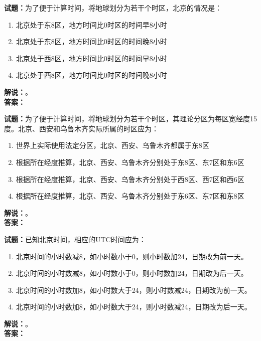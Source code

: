 \documentclass{ctexbook}
\begin{document}
\noindent\textbf{试题：}为了便于计算时间，将地球划分为若干个时区，北京的情况是：
\begin{enumerate}[leftmargin=3em]
\item 北京处于东8区，地方时间比0时区的时间早8小时
\item 北京处于东8区，地方时间比0时区的时间晚8小时
\item 北京处于西8区，地方时间比0时区的时间早8小时
\item 北京处于西8区，地方时间比0时区的时间晚8小时
\end{enumerate}
\noindent\textbf{解说：}\textbf{}。\\\noindent\textbf{答案：}

\bigskip




\noindent\textbf{试题：}为了便于计算时间，将地球划分为若干个时区，其理论分区为每区宽经度15度。北京、西安和乌鲁木齐实际所属的时区应为：
\begin{enumerate}[leftmargin=3em]
\item 世界上实际使用法定分区，北京、西安、乌鲁木齐都属于东8区
\item 根据所在经度推算，北京、西安、乌鲁木齐分别处于东8区、东7区和东6区
\item 根据所在经度推算，北京、西安、乌鲁木齐分别处于西8区、西7区和西6区
\item 根据所在经度推算，北京、西安、乌鲁木齐分别处于东6区、东7区和东8区
\end{enumerate}
\noindent\textbf{解说：}\textbf{}。\\\noindent\textbf{答案：}

\bigskip




\noindent\textbf{试题：}已知北京时间，相应的UTC时间应为：
\begin{enumerate}[leftmargin=3em]
\item 北京时间的小时数减8，如小时数小于0，则小时数加24，日期改为前一天。
\item 北京时间的小时数减8，如小时数小于0，则小时数加24，日期改为后一天。
\item 北京时间的小时数加8，如小时数大于24，则小时数减24，日期改为前一天。
\item 北京时间的小时数加8，如小时数大于24，则小时数减24，日期改为后一天。
\end{enumerate}
\noindent\textbf{解说：}\textbf{}。\\\noindent\textbf{答案：}

\bigskip
\end{document}
